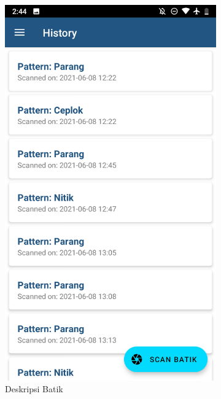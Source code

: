 \begin{figure}[hpt!]
\begin{subfigure}[b]{0.3\textwidth}
      \centering
      
      \includegraphics[width=\textwidth]{gambar/empat.png}
      
      \caption{Deskripsi Batik}
      
      \label{fig:empat}
    \end{subfigure}
    \hfill
    \begin{subfigure}[b]{0.3\textwidth}
      
      \centering
      

\end{subfigure}
\end{figure}
